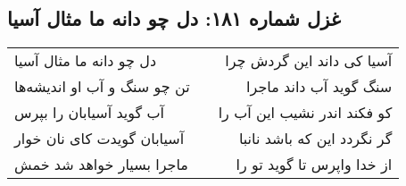 \begin{center}
\section*{غزل شماره ۱۸۱: دل چو دانه ما مثال آسیا}
\label{sec:0181}
\begin{longtable}{l p{0.5cm} r}
دل چو دانه ما مثال آسیا
&&
آسیا کی داند این گردش چرا
\\
تن چو سنگ و آب او اندیشه‌ها
&&
سنگ گوید آب داند ماجرا
\\
آب گوید آسیابان را بپرس
&&
کو فکند اندر نشیب این آب را
\\
آسیابان گویدت کای نان خوار
&&
گر نگردد این که باشد نانبا
\\
ماجرا بسیار خواهد شد خمش
&&
از خدا واپرس تا گوید تو را
\\
\end{longtable}
\end{center}
